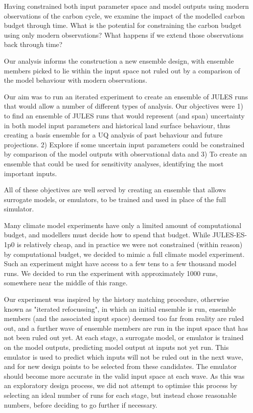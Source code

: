 \documentclass[gmd, manuscript]{copernicus}
\begin{document}
Having constrained both input parameter space and model outputs using modern observations of the carbon cycle, we examine the impact of the modelled carbon budget through time. What is the potential for constraining the carbon budget using only modern observations? What happens if we extend those observations back through time?

Our analysis informs the construction a new ensemble design, with ensemble members picked to lie within the input space not ruled out by a comparison of the model behaviour with modern observations. 

Our aim was to run an iterated experiment to create an ensemble of JULES runs that would allow  a number of different types of analysis. Our objectives were 1) to find an ensemble of JULES runs that would represent (and span) uncertainty in both model input parameters and historical land surface behaviour, thus creating a basis ensemble for a UQ analysis of past behaviour and future projections. 2) Explore if some uncertain input parameters could be constrained by comparison of the model outputs with observational data and 3) To create an ensemble that could be used for sensitivity analyses, identifying the most important inputs. 

All of these objectives are well served by creating an ensemble that allows surrogate models, or emulators, to be trained and used in place of the full simulator.

Many climate model experiments have only a limited amount of computational budget, and modellers must decide how to spend that budget. While JULES-ES-1p0 is relatively cheap, and in practice we were not constrained (within reason) by computational budget, we decided to mimic a full climate model experiment. Such an experiment might have access to a few tens to a few thousand model runs. We decided to run the experiment with approximately 1000 runs, somewhere near the middle of this range.

Our experiment was inspired by the history matching procedure, otherwise known as "iterated refocussing", in which an initial ensemble is run, ensemble members (and the associated input space) deemed too far from reality are ruled out, and a further wave of ensemble members are run in the input space that has not been ruled out yet. At each stage, a surrogate model, or emulator is trained on the model outputs, predicting model output at inputs not yet run. This emulator is used to predict which inputs will not be ruled out in the next wave, and for new design points to be selected from these candidates. The emulator should become more accurate in the valid input space at each wave. As this was an exploratory design process, we did not attempt to optimise this process by selecting an ideal number of runs for each stage, but instead chose reasonable numbers, before deciding to go further if necessary.
\end{document}
